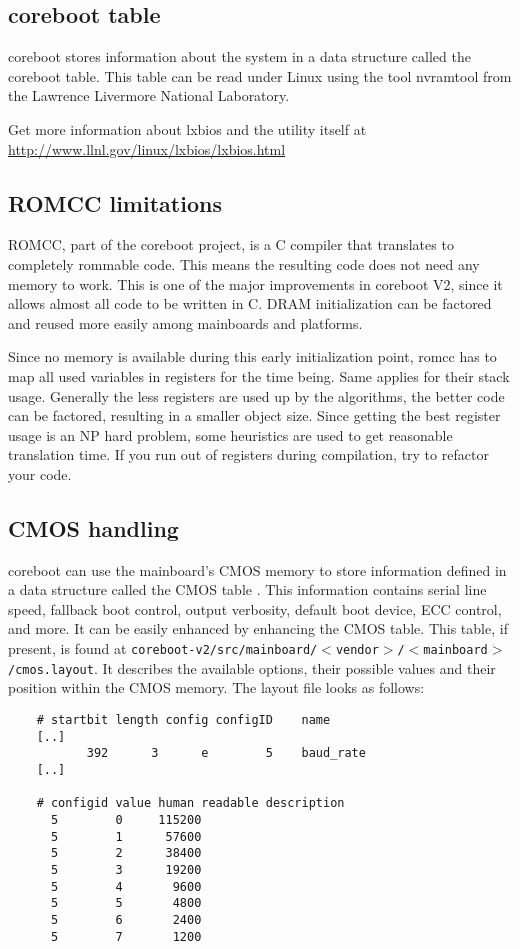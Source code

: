 \documentclass[titlepage,12pt]{article}
\begin{document}
\subsection{coreboot table}
coreboot stores information about the system in a data structure called
the coreboot table. This table can be read under Linux using the tool
nvramtool from the Lawrence Livermore National Laboratory.

Get more information about lxbios and the utility itself at
\url{http://www.llnl.gov/linux/lxbios/lxbios.html}

\subsection{ROMCC limitations}
ROMCC, part of the coreboot project, is a C compiler that translates to
completely rommable code. This means the resulting code does not need
any memory to work. This is one of the major improvements in coreboot
V2, since it allows almost all code to be written in C. DRAM
initialization can be factored and reused more easily among mainboards
and platforms.

Since no memory is available during this early initialization point,
romcc has to map all used variables in registers for the time being.
Same applies for their stack usage.  Generally the less registers are
used up by the algorithms, the better code can be factored, resulting in
a smaller object size. Since getting the best register usage is an NP
hard problem, some heuristics are used to get reasonable translation
time. If you run out of registers during compilation, try to refactor
your code.

\subsection{CMOS handling}
coreboot can use the mainboard's CMOS memory to store information
defined in a data structure called the CMOS table . This information
contains serial line speed, fallback boot control, output verbosity,
default boot device, ECC control, and more. It can be easily enhanced by
enhancing the CMOS table. This table, if present, is found at
\texttt{coreboot-v2/src/mainboard/$<$vendor$>$/$<$mainboard$>$/cmos.layout}.
It describes the available options, their possible values and their
position within the CMOS memory. The layout file looks as follows:
\begin{verbatim}
    # startbit length config configID    name
    [..]
           392      3      e        5    baud_rate
    [..]

    # configid value human readable description
      5        0     115200
      5        1      57600
      5        2      38400
      5        3      19200
      5        4       9600
      5        5       4800
      5        6       2400
      5        7       1200

\end{verbatim}
\end{document}
